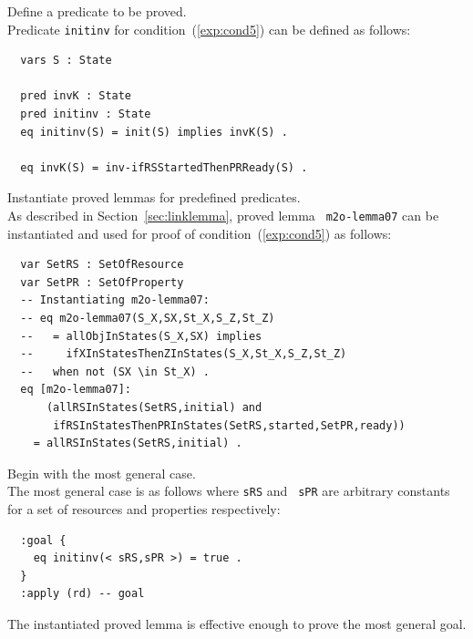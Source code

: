 \documentclass[12pt]{report}
\begin{document}
 Define a predicate to be proved. \\ Predicate
         {\tt initinv} for condition~(\ref{exp:cond5}) can be defined
         as follows:
\small
\begin{verbatim}
  vars S : State

  pred invK : State
  pred initinv : State
  eq initinv(S) = init(S) implies invK(S) .

  eq invK(S) = inv-ifRSStartedThenPRReady(S) .
\end{verbatim}
\normalsize

 Instantiate proved lemmas for predefined
predicates. \\
As described in Section~\ref{sec:linklemma}, proved lemma {\tt
  m2o-lemma07} can be instantiated and used for proof of
condition~(\ref{exp:cond5}) as follows:
\small
\begin{verbatim}
  var SetRS : SetOfResource
  var SetPR : SetOfProperty
  -- Instantiating m2o-lemma07:
  -- eq m2o-lemma07(S_X,SX,St_X,S_Z,St_Z)
  --   = allObjInStates(S_X,SX) implies 
  --     ifXInStatesThenZInStates(S_X,St_X,S_Z,St_Z)
  --   when not (SX \in St_X) .
  eq [m2o-lemma07]:
      (allRSInStates(SetRS,initial) and 
       ifRSInStatesThenPRInStates(SetRS,started,SetPR,ready))
    = allRSInStates(SetRS,initial) .
\end{verbatim}
\normalsize

 Begin with the most general case. \\
The most general case is as follows where {\tt sRS} and {\tt
  sPR} are arbitrary constants for a set of resources and properties
respectively:
\small
\begin{verbatim}
  :goal {
    eq initinv(< sRS,sPR >) = true .
  }
  :apply (rd) -- goal
\end{verbatim}
\normalsize
The instantiated proved lemma is effective enough to prove the most
general goal.\\
\end{document}
